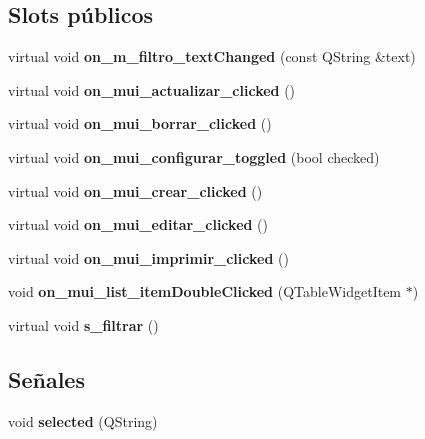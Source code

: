 \subsection*{Slots p\'{u}blicos}
\begin{CompactItemize}
\item 
virtual void {\bf on\_\-m\_\-filtro\_\-text\-Changed} (const QString \&text)\label{classPedidosProveedorList_i0}

\item 
virtual void {\bf on\_\-mui\_\-actualizar\_\-clicked} ()\label{classPedidosProveedorList_i1}

\item 
virtual void {\bf on\_\-mui\_\-borrar\_\-clicked} ()\label{classPedidosProveedorList_i2}

\item 
virtual void {\bf on\_\-mui\_\-configurar\_\-toggled} (bool checked)\label{classPedidosProveedorList_i3}

\item 
virtual void {\bf on\_\-mui\_\-crear\_\-clicked} ()\label{classPedidosProveedorList_i4}

\item 
virtual void {\bf on\_\-mui\_\-editar\_\-clicked} ()\label{classPedidosProveedorList_i5}

\item 
virtual void {\bf on\_\-mui\_\-imprimir\_\-clicked} ()\label{classPedidosProveedorList_i6}

\item 
void {\bf on\_\-mui\_\-list\_\-item\-Double\-Clicked} (QTable\-Widget\-Item $\ast$)\label{classPedidosProveedorList_i7}

\item 
virtual void {\bf s\_\-filtrar} ()\label{classPedidosProveedorList_i8}

\end{CompactItemize}
\subsection*{Se\~{n}ales}
\begin{CompactItemize}
\item 
void {\bf selected} (QString)\label{classPedidosProveedorList_l0}

\end{CompactItemize}

